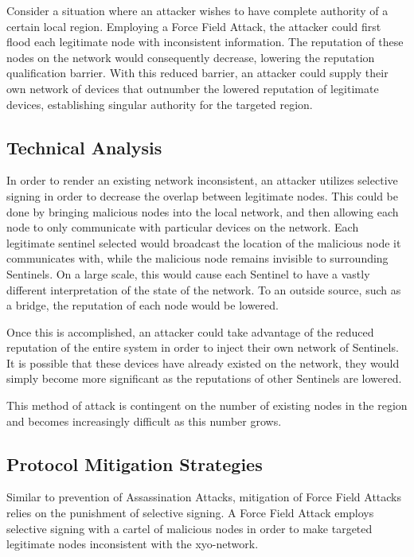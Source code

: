 \documentclass{article}
\begin{document}
Consider a situation where an attacker wishes to have complete authority of a certain local region. Employing a Force Field Attack, the attacker could first flood each legitimate node with inconsistent information. The reputation of these nodes on the network would consequently decrease, lowering the reputation qualification barrier. With this reduced barrier, an attacker could supply their own network of devices that outnumber the lowered reputation of legitimate devices, establishing singular authority for the targeted region. 

\subsection{Technical Analysis}

In order to render an existing network inconsistent, an attacker utilizes selective signing in order to decrease the overlap between legitimate nodes. This could be done by bringing malicious nodes into the local network, and then allowing each node to only communicate with particular devices on the network. Each legitimate \Gls{sentinel} selected would broadcast the location of the malicious node it communicates with, while the malicious node remains invisible to surrounding Sentinels. On a large scale, this would cause each Sentinel to have a vastly different interpretation of the state of the network. To an outside source, such as a \Gls{bridge}, the reputation of each node would be lowered.

Once this is accomplished, an attacker could take advantage of the reduced reputation of the entire system in order to inject their own network of Sentinels. It is possible that these devices have already existed on the network, they would simply become more significant as the reputations of other Sentinels are lowered.

This method of attack is contingent on the number of existing nodes in the region and becomes increasingly difficult as this number grows.

\subsection{Protocol Mitigation Strategies}

Similar to prevention of Assassination Attacks, mitigation of Force Field Attacks relies on the punishment of selective signing. A Force Field Attack employs selective signing with a cartel of malicious nodes in order to make targeted legitimate nodes inconsistent with the \Gls{xyo-network}. 
\end{document}
